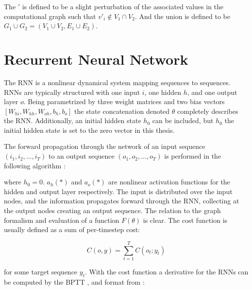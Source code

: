 \noindent
The $'$ is defined to be a slight perturbation of the associated values in the computational graph such that $v'_i \notin V_1 \cap V_2$. And the union is defined to be $G_1 \cup G_2 = (V_1 \cup V_2, E_1 \cup E_2)$.

\section{Recurrent Neural Network}

The RNN is a nonlinear dynamical system mapping sequences to sequences. RNNs are typically structured with one input $i$, one hidden $h$, and one output layer $o$. Being parametrized by three weight matrices and two bias vectors \([W_{hi}, W_{hh}, W_{oh}, b_h, b_o]\) the state concatenation denoted \(\theta\) completely describes the RNN. Additionally, an initial hidden state $h_0$ can be included, but $h_0$ the initial hidden state is set to the zero vector in this thesis.

The forward propagation through the network of an input sequence \((i_1, i_2, ... , i_T)\) to an output sequence \((o_1, o_2, ..., o_T) \) is performed in the following algorithm \cite{suts}:

\begin{algorithmic}[1]
    \EndFor
\end{algorithmic}

\noindent
where $h_0 = 0$. $a_h(*)$ and $a_o(*)$ are nonlinear activation functions for the hidden and output layer respectively. The input is distributed over the input nodes, and the information propagates forward through the RNN, collecting at the output nodes creating an output sequence. The relation to the graph formalism and evaluation of a function $F(\theta)$ is clear. The cost function is usually defined as a sum of per-timestep cost:

\[C(o, y) = \sum_{t=1}^{T}C(o_t; y_t)\]

\noindent
for some target sequence $y_t$. With the cost function a derivative for the RNNs can be computed by the BPTT \cite{RNN1}, and format from \cite{suts}:

\begin{algorithmic}[1]
    \EndFor
    \State {}
\end{algorithmic}

